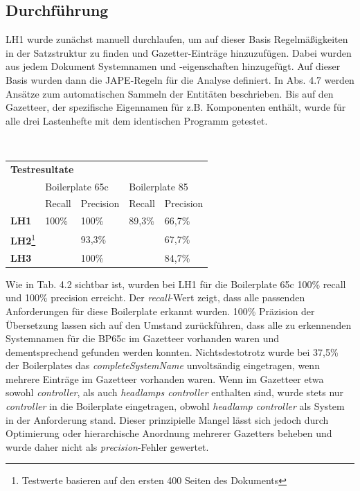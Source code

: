\documentclass[12pt]{report}
\begin{document}
\subsection{Durchführung}
LH1 wurde zunächst manuell durchlaufen, um auf dieser Basis Regelmäßigkeiten in der Satzstruktur zu finden und Gazetter-Einträge hinzuzufügen. Dabei wurden aus jedem Dokument Systemnamen und -eigenschaften hinzugefügt. Auf dieser Basis wurden dann die JAPE-Regeln für die Analyse definiert. In Abs. 4.7 werden Ansätze zum automatischen Sammeln der Entitäten beschrieben. Bis auf den Gazetteer, der spezifische Eigennamen für z.B. Komponenten enthält, wurde für alle drei Lastenhefte mit dem identischen Programm getestet.

\vspace{12pt}
\begin{table}[h!]
\tt
\begin{tabular}{lllll}
\multicolumn{5}{l}{\textbf{Testresultate}}                                                                            \\
\multicolumn{1}{l|}{}             & \multicolumn{2}{l|}{Boilerplate 65c}    & \multicolumn{2}{l|}{Boilerplate 85}     \\
\multicolumn{1}{l|}{}             & Recall & \multicolumn{1}{l|}{Precision} & Recall & \multicolumn{1}{l|}{Precision} \\ \hline
\multicolumn{1}{l|}{\textbf{LH1}} & 100\%  & \multicolumn{1}{l|}{100\%}     & 89,3\% & \multicolumn{1}{l|}{66,7\%}    \\
\multicolumn{1}{l|}{\textbf{LH2}\footnote{Testwerte basieren auf den ersten 400 Seiten des Dokuments}} &        & \multicolumn{1}{l|}{93,3\%} &  	  &  \multicolumn{1}{l|}{67,7\%}          \\
\multicolumn{1}{l|}{\textbf{LH3}} &   & \multicolumn{1}{l|}{100\%}     & 	  & \multicolumn{1}{l|}{84,7\%}    
\end{tabular}
\rm
{}
\end{table}
\vspace{12pt}

Wie in Tab. 4.2 sichtbar ist, wurden bei LH1 für die Boilerplate 65c 100\% recall und 100\% precision erreicht. Der \textit{recall}-Wert zeigt, dass alle passenden Anforderungen für diese Boilerplate erkannt wurden. 100\% Präzision der Übersetzung lassen sich auf den Umstand zurückführen, dass alle zu erkennenden Systemnamen für die BP65c im Gazetteer vorhanden waren und dementsprechend gefunden werden konnten. Nichtsdestotrotz wurde bei 37,5\% der Boilerplates das \textit{completeSystemName} unvoltsändig eingetragen, wenn mehrere Einträge im Gazetteer vorhanden waren. Wenn im Gazetteer etwa sowohl \textit{controller}, als auch \textit{headlamps controller} enthalten sind, wurde stets nur \textit{controller} in die Boilerplate eingetragen, obwohl \textit{headlamp controller} als System in der Anforderung stand. Dieser prinzipielle Mangel lässt sich jedoch durch Optimierung oder hierarchische Anordnung mehrerer Gazetters beheben und wurde daher nicht als \textit{precision}-Fehler gewertet.
\end{document}
